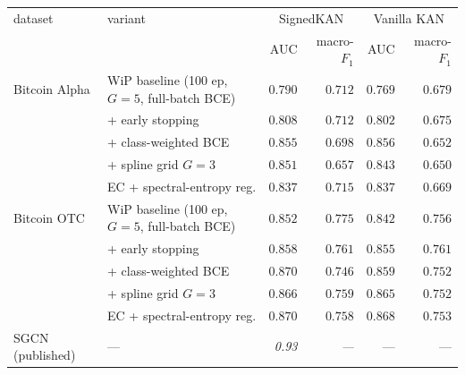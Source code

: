 \begin{tabular}{@{}llrrrr@{}}
\toprule
dataset & variant & \multicolumn{2}{c}{SignedKAN} & \multicolumn{2}{c}{Vanilla KAN} \\
        &         & AUC & macro-$F_1$ & AUC & macro-$F_1$ \\
\midrule
Bitcoin Alpha & WiP baseline (100 ep, $G\!=\!5$, full-batch BCE) & $0.790$ & $0.712$ & $0.769$ & $0.679$ \\
 & + early stopping & $0.808$ & $0.712$ & $0.802$ & $0.675$ \\
 & + class-weighted BCE & $0.855$ & $0.698$ & $0.856$ & $0.652$ \\
 & + spline grid $G\!=\!3$ & $0.851$ & $0.657$ & $0.843$ & $0.650$ \\
 & EC + spectral-entropy reg. & $0.837$ & $0.715$ & $0.837$ & $0.669$ \\
\midrule
Bitcoin OTC & WiP baseline (100 ep, $G\!=\!5$, full-batch BCE) & $0.852$ & $0.775$ & $0.842$ & $0.756$ \\
 & + early stopping & $0.858$ & $0.761$ & $0.855$ & $0.761$ \\
 & + class-weighted BCE & $0.870$ & $0.746$ & $0.859$ & $0.752$ \\
 & + spline grid $G\!=\!3$ & $0.866$ & $0.759$ & $0.865$ & $0.752$ \\
 & EC + spectral-entropy reg. & $0.870$ & $0.758$ & $0.868$ & $0.753$ \\
\midrule
SGCN \cite{derr2018sgcn} (published) & --- & \textit{0.93} & \textit{---} & --- & --- \\
\bottomrule
\end{tabular}
